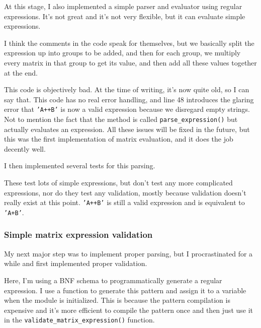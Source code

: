 \documentclass[../main.tex]{subfiles}
\begin{document}
At this stage, I also implemented a simple parser and evaluator using regular expressions. It's not great and it's not very flexible, but it can evaluate simple expressions.


I think the comments in the code speak for themselves, but we basically split the expression up into groups to be added, and then for each group, we multiply every matrix in that group to get its value, and then add all these values together at the end.

This code is objectively bad. At the time of writing, it's now quite old, so I can say that. This code has no real error handling, and line 48 introduces the glaring error that \texttt{'A++B'} is now a valid expression because we disregard empty strings. Not to mention the fact that the method is called \texttt{parse\_expression()} but actually evaluates an expression. All these issues will be fixed in the future, but this was the first implementation of matrix evaluation, and it does the job decently well.

I then implemented several tests for this parsing.


These test lots of simple expressions, but don't test any more complicated expressions, nor do they test any validation, mostly because validation doesn't really exist at this point. \texttt{'A++B'} is still a valid expression and is equivalent to \texttt{'A+B'}.

\subsubsection{Simple matrix expression validation\label{development:matrices-backend:simple-matrix-expression-validation}}

My next major step was to implement proper parsing, but I procrastinated for a while and first implemented proper validation.


Here, I'm using a BNF schema to programmatically generate a regular expression. I use a function to generate this pattern and assign it to a variable when the module is initialized. This is because the pattern compilation is expensive and it's more efficient to compile the pattern once and then just use it in the \texttt{validate\_matrix\_expression()} function.
\end{document}
